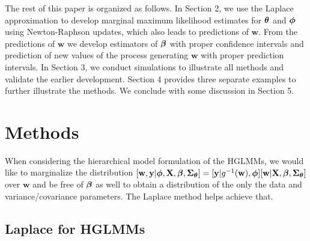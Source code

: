 \documentclass[12pt, titlepage]{article}
\begin{document}
The rest of this paper is organized as follows. In Section 2, we use the Laplace approximation to develop marginal maximum likelihood estimates for $\boldsymbol{\theta}$ and $\boldsymbol{\phi}$ using Newton-Raphson updates, which also leads to predictions of $\mathbf{w}$.  From the predictions of $\mathbf{w}$ we develop estimators of $\boldsymbol{\beta}$ with proper confidence intervals and prediction of new values of the process generating $\mathbf{w}$ with proper prediction intervals.  In Section 3, we conduct simulations to illustrate all methods and validate the earlier development.  Section 4 provides three separate examples to further illustrate the methods.  We conclude with some discussion in Section 5.



\section{Methods}

When considering the hierarchical model formulation of the HGLMMs, we would like to marginalize the distribution $[\mathbf{w}, \mathbf{y}|\boldsymbol{\phi},\mathbf{X},\boldsymbol{\beta},\mbox{\boldmath $\Sigma$}_{\boldsymbol{\theta}}] = [\mathbf{y}|g^{-1}(\mathbf{w}),\boldsymbol{\phi}][\mathbf{w}|\mathbf{X},\boldsymbol{\beta},\mbox{\boldmath $\Sigma$}_{\boldsymbol{\theta}}]$ over $\mathbf{w}$ and be free of $\boldsymbol{\beta}$ as well to obtain a distribution of the only the data and variance/covariance parameters. The Laplace method helps achieve that.


\subsection{Laplace for HGLMMs}
\end{document}
